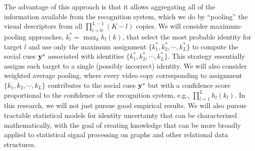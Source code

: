 The advantage of this approach is that it allows aggregating all of the information available from the recognition system, which we do by ``pooling'' the visual descriptors from all $\prod_{l=0}^{L-1}(K-l)$ copies. We will consider maximum-pooling approaches, $k_l^{*}=\max_{k}h_l(k)$, that select the most probable identity for target $l$ and use only the maximum assignment $\{k_1^{*}, k_2^{*}, \cdots, k_L^{*}\}$ to compute the social cues ${\bf y}^s$ associated with identities $\{k_1^{*}, k_2^{*}, \cdots, k_L^{*}\}$. This strategy essentially assigns each target to a single (possibly incorrect) identity. We will also consider weighted average pooling, where every video copy corresponding to assignment $\{k_1, k_2, \cdots, k_L\}$ contributes to the social cues ${\bf y}^s$ but with a confidence score proportional to the confidence of the recognition system, e.g., $\prod_{l=1}^{L}h_l(k_l)$. In this research, we will not just pursue good empirical results. We will also pursue tractable statistical models for identity uncertainty that can be characterized mathematically, with the goal of creating knowledge that can be more broadly applied to statistical signal processing on graphs and other relational data structures. 